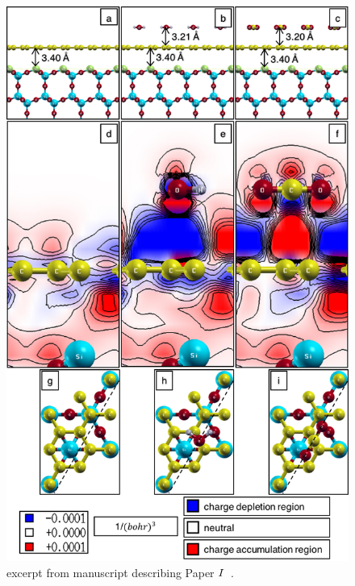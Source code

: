 \begin{figure}
    \centering
    \includegraphics[scale=0.9,keepaspectratio]{Figs/Paper1a.jpg} %
    \caption{excerpt from manuscript describing Paper \hyperref[P1]{$\Rmnum{1}$}~\cite{Elgammal2017}.}
    \label{paper1a}
\end{figure}

